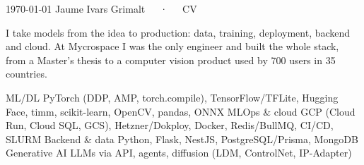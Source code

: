 \documentclass[11pt, a4paper]{../awesome-cv}
\begin{document}
\makecvheader[C]

\makecvfooter
  {\today}
  {Jaume Ivars Grimalt~~~·~~~CV}
  {\thepage}



\begin{cvparagraph}
I take models from the idea to production: data, training, deployment, backend and cloud. At Mycrospace I was the only engineer and built the whole stack, from a Master's thesis to a computer vision product used by 700 users in 35 countries.
\end{cvparagraph}

\begin{cvskills}
  \cvskill
    {ML/DL}
    {PyTorch (DDP, AMP, torch.compile), TensorFlow/TFLite, Hugging Face, timm, scikit-learn, OpenCV, pandas, ONNX}
  \cvskill
    {MLOps \& cloud}
    {GCP (Cloud Run, Cloud SQL, GCS), Hetzner/Dokploy, Docker, Redis/BullMQ, CI/CD, SLURM}
  \cvskill
    {Backend \& data}
    {Python, Flask, NestJS, PostgreSQL/Prisma, MongoDB}
  \cvskill
    {Generative AI}
    {LLMs via API, agents, diffusion (LDM, ControlNet, IP-Adapter)}
\end{cvskills}
\end{document}
